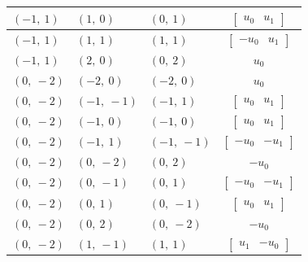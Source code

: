 \documentclass[11pt]{article}
\theoremstyle{definition}
\begin{document}
\begin{longtable}{|l|l|l|c|}
    \hline
    $\left( -1, \  1\right)$ & $\left( 1, \  0\right)$ & $\left( 0, \  1\right)$ & $\left[\begin{matrix}u_{0} & u_{1}\end{matrix}\right]$ \\
    \hline
    $\left( -1, \  1\right)$ & $\left( 1, \  1\right)$ & $\left( 1, \  1\right)$ & $\left[\begin{matrix}- u_{0} & u_{1}\end{matrix}\right]$ \\
    \hline
    $\left( -1, \  1\right)$ & $\left( 2, \  0\right)$ & $\left( 0, \  2\right)$ & $u_{0}$ \\
    \hline
    $\left( 0, \  -2\right)$ & $\left( -2, \  0\right)$ & $\left( -2, \  0\right)$ & $u_{0}$ \\
    \hline
    $\left( 0, \  -2\right)$ & $\left( -1, \  -1\right)$ & $\left( -1, \  1\right)$ & $\left[\begin{matrix}u_{0} & u_{1}\end{matrix}\right]$ \\
    \hline
    $\left( 0, \  -2\right)$ & $\left( -1, \  0\right)$ & $\left( -1, \  0\right)$ & $\left[\begin{matrix}u_{0} & u_{1}\end{matrix}\right]$ \\
    \hline
    $\left( 0, \  -2\right)$ & $\left( -1, \  1\right)$ & $\left( -1, \  -1\right)$ & $\left[\begin{matrix}- u_{0} & - u_{1}\end{matrix}\right]$ \\
    \hline
    $\left( 0, \  -2\right)$ & $\left( 0, \  -2\right)$ & $\left( 0, \  2\right)$ & $- u_{0}$ \\
    \hline
    $\left( 0, \  -2\right)$ & $\left( 0, \  -1\right)$ & $\left( 0, \  1\right)$ & $\left[\begin{matrix}- u_{0} & - u_{1}\end{matrix}\right]$ \\
    \hline
    $\left( 0, \  -2\right)$ & $\left( 0, \  1\right)$ & $\left( 0, \  -1\right)$ & $\left[\begin{matrix}u_{0} & u_{1}\end{matrix}\right]$ \\
    \hline
    $\left( 0, \  -2\right)$ & $\left( 0, \  2\right)$ & $\left( 0, \  -2\right)$ & $- u_{0}$ \\
    \hline
    $\left( 0, \  -2\right)$ & $\left( 1, \  -1\right)$ & $\left( 1, \  1\right)$ & $\left[\begin{matrix}u_{1} & - u_{0}\end{matrix}\right]$ \\

\end{longtable}
\end{document}
